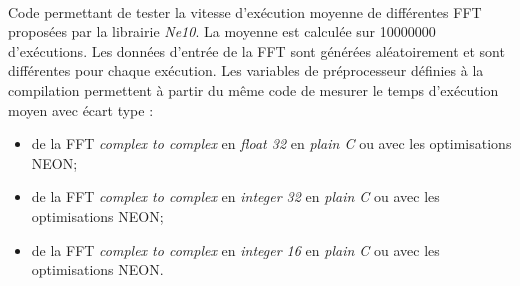 \documentclass{article}
\begin{document}
\paragraph{}
Code permettant de tester la vitesse d'exécution moyenne de différentes FFT proposées par la librairie \emph{Ne10}. La moyenne est calculée sur \SI{10000000}{} d'exécutions. Les données d'entrée de la FFT sont générées aléatoirement et sont différentes pour chaque exécution. Les variables de préprocesseur définies à la compilation permettent à partir du même code de mesurer le temps d'exécution moyen avec écart type :
\begin{itemize}
    \item de la FFT \emph{complex to complex} en \emph{float 32} en \emph{plain C} ou avec les optimisations NEON;
    \item de la FFT \emph{complex to complex} en \emph{integer 32} en \emph{plain C} ou avec les optimisations NEON;
    \item de la FFT \emph{complex to complex} en \emph{integer 16} en \emph{plain C} ou avec les optimisations NEON.
\end{itemize}
\lstset{language=C++}
\end{document}

